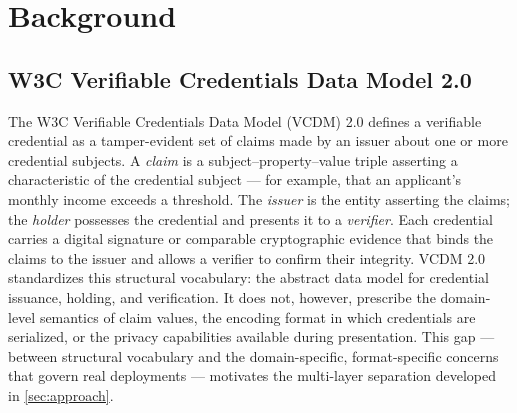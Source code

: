
\section{Background}\label{background}

\label{sec:background}

\subsection{W3C Verifiable Credentials Data Model 2.0}\label{w3c-verifiable-credentials-data-model-2.0}

\label{sec:vcdm}

The W3C Verifiable Credentials Data Model (VCDM) 2.0 \citep{manu_verifiable_2025} defines a verifiable credential as a tamper-evident set of claims made by an issuer about one or more credential subjects. A \emph{claim} is a subject--property--value triple asserting a characteristic of the credential subject --- for example, that an applicant's monthly income exceeds a threshold. The \emph{issuer} is the entity asserting the claims; the \emph{holder} possesses the credential and presents it to a \emph{verifier}. Each credential carries a digital signature or comparable cryptographic evidence that binds the claims to the issuer and allows a verifier to confirm their integrity. VCDM 2.0 standardizes this structural vocabulary: the abstract data model for credential issuance, holding, and verification. It does not, however, prescribe the domain-level semantics of claim values, the encoding format in which credentials are serialized, or the privacy capabilities available during presentation. This gap --- between structural vocabulary and the domain-specific, format-specific concerns that govern real deployments --- motivates the multi-layer separation developed in \autoref{sec:approach}.

